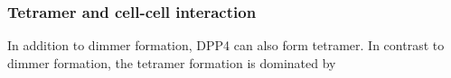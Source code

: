 \subsubsection{Tetramer and cell-cell interaction}

In addition to dimmer formation, DPP4 can also form tetramer. In contrast to dimmer formation, the tetramer formation is dominated by